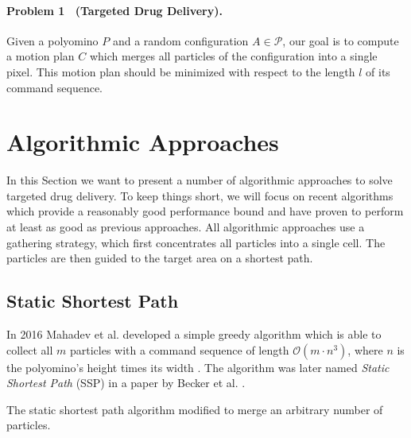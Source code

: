 \paragraph{Problem 1 \ \textnormal{(Targeted Drug Delivery).}} Given a polyomino $P$ and a random configuration $A \in \mathcal{P}$, our goal is to compute a motion plan $C$ which merges all particles of the configuration into a single pixel. This motion plan should be minimized with respect to the length $l$ of its command sequence.


\section{Algorithmic Approaches} \label{sec:TDDPreviousWork}
In this Section we want to present a number of algorithmic approaches to solve targeted drug delivery. To keep things short, we will focus on recent algorithms which provide a reasonably good performance bound and have proven to perform at least as good as previous approaches. All algorithmic approaches use a gathering strategy, which first concentrates all particles into a single cell. The particles are then guided to the target area on a shortest path.

\subsection{Static Shortest Path}
In 2016 Mahadev et al. developed a simple greedy algorithm which is able to collect all $m$ particles with a command sequence of length $\mathcal{O}(m \cdot n^3)$, where $n$ is the polyomino's height times its width \cite{mahadev2016collecting}. The algorithm was later named \textit{Static Shortest Path} (SSP) in a paper by Becker et al. \cite{becker2020}. 

\begin{algorithm}[ht]


    
    \caption[Static Shortest Path Algorithm]{The static shortest path algorithm modified to merge an arbitrary number of particles.} \label{alg:SSP}
\end{algorithm}

